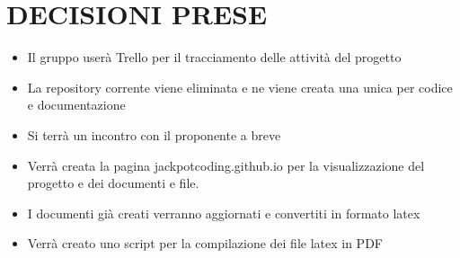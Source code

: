 \documentclass[5pt]{article}
\begin{document}
\section{DECISIONI PRESE}
\begin{itemize}
    \item Il gruppo userà Trello per il tracciamento delle attività del progetto
    \item La repository corrente viene eliminata e ne viene creata una unica per codice e documentazione
    \item Si terrà un incontro con il proponente a breve
    \item Verrà creata la pagina jackpotcoding.github.io per la visualizzazione del progetto e dei documenti e file.
    \item I documenti già creati verranno aggiornati e convertiti in formato latex
    \item Verrà creato uno script per la compilazione dei file latex in PDF

\end{itemize}

\end{document}
